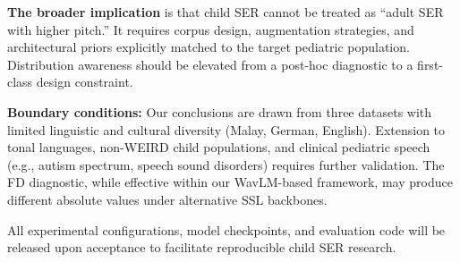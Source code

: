 \documentclass[11pt,a4paper]{article}
\begin{document}
\textbf{The broader implication} is that child SER cannot be treated as ``adult
SER with higher pitch.'' It requires corpus design, augmentation strategies,
and architectural priors explicitly matched to the target pediatric population.
Distribution awareness should be elevated from a post-hoc diagnostic to a
first-class design constraint.

\textbf{Boundary conditions:} Our conclusions are drawn from three datasets
with limited linguistic and cultural diversity (Malay, German, English).
Extension to tonal languages, non-WEIRD child populations, and clinical
pediatric speech (e.g., autism spectrum, speech sound disorders) requires
further validation. The FD diagnostic, while effective within our WavLM-based
framework, may produce different absolute values under alternative SSL
backbones.

All experimental configurations, model checkpoints, and evaluation code will be
released upon acceptance to facilitate reproducible child SER research.

\end{document}
